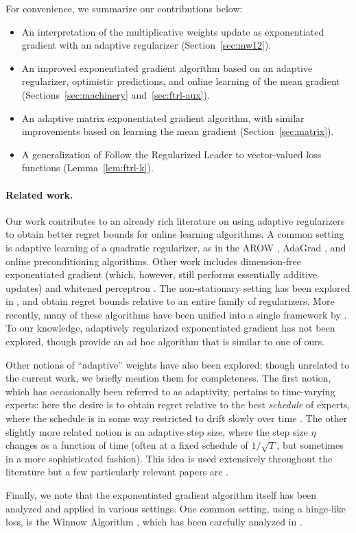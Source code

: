 \documentclass[paper_icml.tex]{subfiles}
\begin{document}
For convenience, we summarize our contributions below:
\begin{itemize}
\item An interpretation of the multiplicative weights update as 
      exponentiated gradient with an adaptive regularizer (Section~\ref{sec:mw12}).
\item An improved exponentiated gradient algorithm based on an adaptive 
      regularizer, optimistic predictions, and online learning of the 
      mean gradient (Sections~\ref{sec:machinery} and~\ref{sec:ftrl-aux}).
\item An adaptive matrix exponentiated gradient algorithm, 
      with similar improvements based on learning the mean gradient 
      (Section~\ref{sec:matrix}).
\item A generalization of Follow the Regularized Leader to vector-valued 
      loss functions (Lemma~\ref{lem:ftrl-k}).
\end{itemize}

\paragraph{Related work.} Our work contributes to an already rich literature 
on using adaptive regularizers to obtain 
better regret bounds for online learning algorithms. A common setting is 
adaptive learning of a quadratic regularizer, as in the AROW 
\cite{crammer2009arow}, AdaGrad \cite{duchi2011adagrad}, and online 
preconditioning \cite{streeter2010} algorithms. 
Other work includes dimension-free 
exponentiated gradient \cite{orabona2013dimension} (which, however, 
still performs essentially additive updates) and whitened perceptron 
\cite{cesa2005perceptron}. The non-stationary setting has been explored 
in \cite{vaits2013}, and \cite{mcmahan2010adaptive} obtain regret bounds 
relative to an entire family of regularizers. More recently, many of these 
algorithms have been unified into a single framework by \cite{orabona2013general}.
To our knowledge, adaptively regularized exponentiated gradient has not 
been explored, though \cite{hazan2010variation} provide an ad hoc algorithm 
that is similar to one of ours.

Other notions of ``adaptive'' weights have also been explored; though unrelated 
to the current work, we briefly mention them for completeness. The first 
notion, which has occasionally been referred to as adaptivity, pertains to time-varying experts: here the desire is to obtain regret relative to the best \emph{schedule} of experts, 
where the schedule is in some way restricted to drift slowly over time 
\cite{auer1998tracking, kleinberg2010regret, chiang2012online}. 
The other slightly more related notion is an adaptive step size, where the step 
size $\eta$ changes as a function of time (often at a fixed schedule of 
$1/\sqrt{T}$, but sometimes in a more sophisticated fashion). This idea is used 
extensively throughout the literature but a few particularly relevant papers are 
\cite{hazan2007adaptive, orabona2013dimension}.

Finally, we note that the exponentiated gradient algorithm itself has been analyzed 
and applied in various settings. One common setting, using a hinge-like loss, 
is the Winnow Algorithm \cite{littlestone1988}, which has been carefully analyzed in 
\cite{sabato2012learning}.
\end{document}
